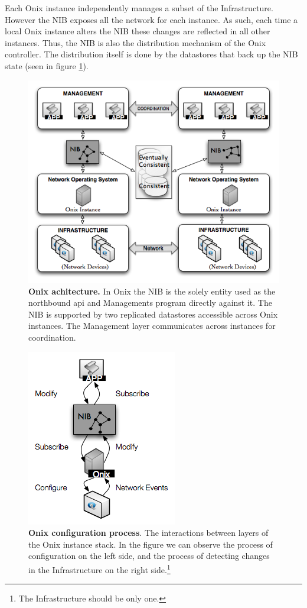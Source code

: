 Each Onix instance  independently manages a subset of the
Infrastructure. However the NIB  exposes all the network for each
instance. As such, each time a local Onix instance alters the NIB these
changes are reflected in all other instances. Thus, the NIB is also
the distribution mechanism of the Onix controller. The  distribution
itself is done by the datastores that back up  the NIB state (seen
in figure \ref{fig:onix-design}).

\begin{figure}
  \centering 
  \includegraphics[scale=0.5]{pic/onix-design.png}
  \caption[Onix architecture] {\textbf{Onix achitecture.} In Onix the NIB is the
    solely entity used as the northbound api and Managements program
    directly against it. The NIB is supported by
    two replicated datastores accessible across Onix instances.  The
    Management layer communicates across instances for coordination.}
  \label{fig:onix-design}
\end{figure}

\begin{figure}
  \centering 
  \includegraphics[scale=0.5]{pic/onix-process.png}
  \caption[Onix configuration process]{\textbf{Onix configuration
      process}. The interactions between layers of the Onix
    instance stack. In the figure we can observe the process of
    configuration on the left side, and the process of detecting
    changes in the Infrastructure on the right side.\footnote{The Infrastructure should be only one.}} 
  \label{fig:onix-process}
\end{figure}

